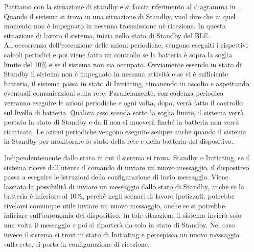 Partiamo con la situazione di standby e si faccia riferimento al diagramma in . Quando il sistema si trova in una situazione di Standby, vuol dire che in quel momento non è impegnato in nessuna trasmissione nè ricezione. In questa situazione di lavoro il sistema, inizia nello stato di Standby del \acs{BLE}. All'occorrenza dell'esecuzione delle azioni periodiche, vengono eseguiti i rispettivi calcoli periodici e poi viene fatto un controllo se la batteria è sopra la soglia limite del 10\% e se il sistema non sia occupato. Ovviamente essendo in stato di Standby il sistema non è impegnato in nessuna attività e se vi è sufficiente batteria, il sistema passa in stato di Initiating, rimanendo in ascolto e aspettando eventuali comunicazioni sulla rete. Parallelamente, con cadenza periodica verranno eseguire le azioni periodiche e ogni volta, dopo, verrà fatto il controllo sul livello di batteria. Qualora esso scenda sotto la soglia limite, il sistema verrà portato in stato di Standby e da li non si muoverà finché la batteria non verrà ricaricata. Le azioni periodiche vengono eseguite sempre anche quando il sistema in Standby per monitorare lo stato della rete e della batteria del dispositivo.

Indipendentemente dallo stato in cui il sistema si trova, Standby o Initiating, se il sistema riceve dall'utente il comando di inviare un nuovo messaggio, il dispositivo passa a eseguire le istruzioni della configurazione di invio messaggio. Viene lasciata la possibilità di inviare un messaggio dallo stato di Standby, anche se la batteria è inferiore al 10\%, perché negli scenari di lavoro ipotizzati, potrebbe rivelarsi comunque utile inviare un nuovo messaggio, anche se si potrebbe inficiare sull'autonomia del dispositivo. In tale situazione il sistema invierà solo una volta il messaggio e poi si riporterà da solo in stato di Standby. Nel caso invece il sistema si trovi in stato di Initiating e percepisca un nuovo messaggio sulla rete, si porta in configurazione di ricezione.
\bigskip


